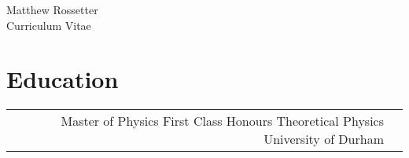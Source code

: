 \documentclass[10pt]{article} %
\begin{document}
\begin{paracol}{2} %


\parbox[top][0.12\textheight][c]{\linewidth}{ %
	\vspace{-0.04\textheight} %
	\centering %
	{\sffamily\Huge Matthew Rossetter}\\\medskip %
	{\Huge\color{headings}\cvtextfont Curriculum Vitae}
}

\section{Education}





\begin{supertabular}{rp{6.7cm}} %


	{Master of Physics} %
    {First Class Honours}
	{Theoretical Physics} %
	{University of Durham} %


\end{supertabular}
\end{paracol}
\end{document}
